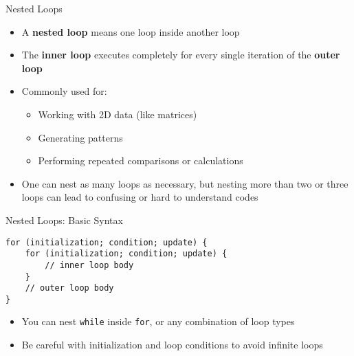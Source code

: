 \documentclass[12pt, aspectratio=169]{beamer}
\begin{document}
    \begin{frame}{Nested Loops}
        \begin{itemize}
            \item A \textbf{nested loop} means one loop inside another loop
            \item The \textbf{inner loop} executes completely for every single iteration of the \textbf{outer loop}
            \item Commonly used for:
            \begin{itemize}
                \item Working with 2D data (like matrices)
                \item Generating patterns
                \item Performing repeated comparisons or calculations
            \end{itemize}
            \item One can nest as many loops as necessary, but nesting more than two or three loops can lead to confusing or hard to understand codes
        \end{itemize}
    \end{frame}


    \begin{frame}[fragile]{Nested Loops: Basic Syntax}
        \begin{verbatim}
for (initialization; condition; update) {
    for (initialization; condition; update) {
        // inner loop body
    }
    // outer loop body
}
        \end{verbatim}

        \begin{itemize}
            \item You can nest \texttt{while} inside \texttt{for}, or any combination of loop types
            \item Be careful with initialization and loop conditions to avoid infinite loops
        \end{itemize}
    \end{frame}


\end{document}
